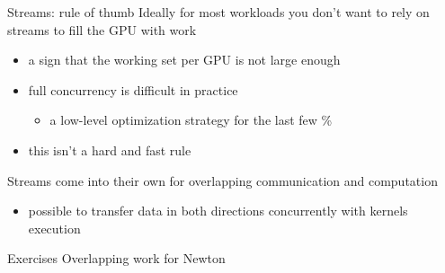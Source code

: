 \begin{frame}[fragile]{Streams: rule of thumb}
    Ideally for most workloads you don't want to rely on streams to fill the GPU with work
    \begin{itemize}
        \item a sign that the working set per GPU is not large enough
        \item full concurrency is difficult in practice
        \begin{itemize}
            \item a low-level optimization strategy for the last few \%
        \end{itemize}
        \item this isn't a hard and fast rule
    \end{itemize}

    Streams come into their own for overlapping communication and computation
    \begin{itemize}
        \item possible to transfer data in both directions concurrently with kernels execution
    \end{itemize}
\end{frame}


\begin{frame}[fragile]{Exercises}
    Overlapping work for Newton
\end{frame}

